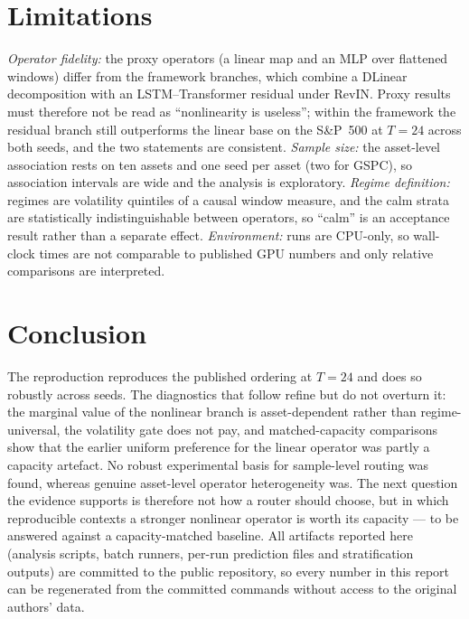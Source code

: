 \documentclass[conference]{IEEEtran}
\begin{document}
\section{Limitations}
\emph{Operator fidelity:} the proxy operators (a linear map and an MLP over flattened windows)
differ from the framework branches, which combine a DLinear decomposition with an
LSTM--Transformer residual under RevIN. Proxy results must therefore not be read as
``nonlinearity is useless''; within the framework the residual branch still outperforms the linear
base on the S\&P~500 at $T=24$ across both seeds, and the two statements are consistent.
\emph{Sample size:} the asset-level association rests on ten assets and one seed per asset (two
for GSPC), so association intervals are wide and the analysis is exploratory.
\emph{Regime definition:} regimes are volatility quintiles of a causal window measure, and the
calm strata are statistically indistinguishable between operators, so ``calm'' is an acceptance
result rather than a separate effect. \emph{Environment:} runs are CPU-only, so wall-clock times
are not comparable to published GPU numbers and only relative comparisons are interpreted.

\section{Conclusion}
The reproduction reproduces the published ordering at $T=24$ and does so robustly across seeds.
The diagnostics that follow refine but do not overturn it: the marginal value of the nonlinear
branch is asset-dependent rather than regime-universal, the volatility gate does not pay, and
matched-capacity comparisons show that the earlier uniform preference for the linear operator was
partly a capacity artefact. No robust experimental basis for sample-level routing was found,
whereas genuine asset-level operator heterogeneity was. The next question the evidence supports is
therefore not how a router should choose, but in which reproducible contexts a stronger nonlinear
operator is worth its capacity --- to be answered against a capacity-matched baseline. All
artifacts reported here (analysis scripts, batch runners, per-run prediction files and
stratification outputs) are committed to the public repository, so every number in this report
can be regenerated from the committed commands without access to the original authors' data.
\end{document}

